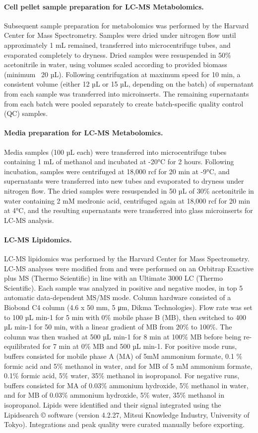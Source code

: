 \documentclass[12pt]{article}
\begin{document}
\paragraph{Cell pellet sample preparation for LC-MS Metabolomics.}
Subsequent sample preparation for metabolomics was performed by the Harvard Center for Mass Spectrometry. Samples were dried under nitrogen flow until approximately 1 mL remained, transferred into microcentrifuge tubes, and evaporated completely to dryness. Dried samples were resuspended in 50\% acetonitrile in water, using volumes scaled according to provided biomass (minimum ~20 µL). Following centrifugation at maximum speed for 10 min, a consistent volume (either 12 µL or 15 µL, depending on the batch) of supernatant from each sample was transferred into microinserts. The remaining supernatants from each batch were pooled separately to create batch-specific quality control (QC) samples.

\paragraph{Media preparation for LC-MS Metabolomics.}
Media samples (100 µL each) were transferred into microcentrifuge tubes containing 1 mL of methanol and incubated at -20°C for 2 hours. Following incubation, samples were centrifuged at 18,000 rcf for 20 min at -9°C, and supernatants were transferred into new tubes and evaporated to dryness under nitrogen flow. The dried samples were resuspended in 50 µL of 30\% acetonitrile in water containing 2 mM medronic acid, centrifuged again at 18,000 rcf for 20 min at 4°C, and the resulting supernatants were transferred into glass microinserts for LC-MS analysis.

\paragraph{LC-MS Lipidomics.}
LC-MS lipidomics was performed by the Harvard Center for Mass Spectrometry. LC-MS analyses were modified from \cite{Miraldi2013-ng} and were performed on an Orbitrap Exactive plus MS (Thermo Scientific) in line with an Ultimate 3000 LC (Thermo Scientific). Each sample was analyzed in positive and negative modes, in top 5 automatic data-dependent MS/MS mode. Column hardware consisted of a Biobond C4 column (4.6 x 50 mm, 5 μm, Dikma Technologies). Flow rate was set to 100 µL min-1 for 5 min with 0\% mobile phase B (MB), then switched to 400 µL min-1 for 50 min, with a linear gradient of MB from 20\% to 100\%. The column was then washed at 500 µL min-1 for 8 min at 100\% MB before being re-equilibrated for 7 min at 0\% MB and 500 µL min-1. For positive mode runs, buffers consisted for mobile phase A (MA) of 5mM ammonium formate, 0.1 \% formic acid and 5\% methanol in water, and for MB of 5 mM ammonium formate, 0.1\% formic acid, 5\% water, 35\% methanol in isopropanol. For negative runs, buffers consisted for MA of 0.03\% ammonium hydroxide, 5\% methanol in water, and for MB of 0.03\% ammonium hydroxide, 5\% water, 35\% methanol in isopropanol. Lipids were identified and their signal integrated using the Lipidsearch © software (version 4.2.27, Mitsui Knowledge Industry, University of Tokyo). Integrations and peak quality were curated manually before exporting. 
\end{document}
